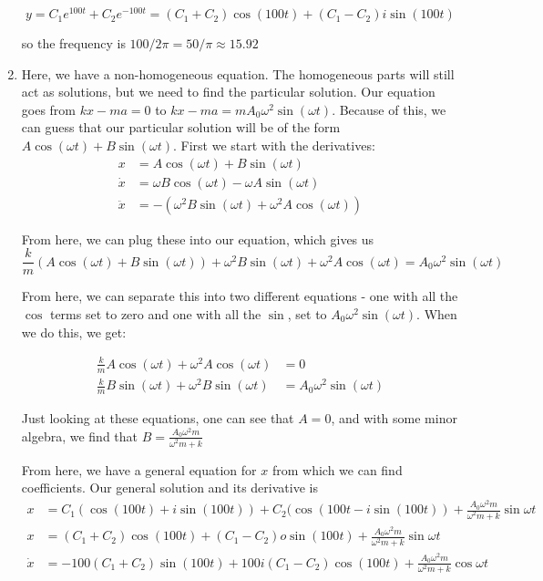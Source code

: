 \documentclass[11pt,answers]{exam}
\begin{document}
\begin{questions}
\begin{solution}
\begin{enumerate}
\[
y = C_1e^{100t} + C_2e^{-100t} = (C_1 + C_2)\cos(100t) + (C_1 - C_2)i\sin{(100t)}
\]

so the frequency is $100/2\pi = 50/\pi \approx 15.92$

\item Here, we have a non-homogeneous equation.  The homogeneous parts will still act as solutions, but we need to find the particular solution.  Our equation goes from $kx - ma = 0$ to $kx - ma = m A_0 \omega^2\sin(\omega t)$.  Because of this, we can guess that our particular solution will be of the form $A\cos(\omega t) + B\sin(\omega t)$.  First we start with the derivatives:
\begin{align*}
x &= A\cos{(\omega t)} + B\sin{(\omega t)}\\
\dot{x} &= \omega B\cos{(\omega t)} - \omega A\sin{(\omega t)}\\
\ddot{x} &= -\left( \omega^2B\sin{(\omega t)} + \omega^2A\cos{(\omega t)} \right)
\end{align*}

From here, we can plug these into our equation, which gives us
\[
\frac{k}{m}\left(A\cos{(\omega t)} + B\sin{(\omega t)}\right) + \omega^2B\sin{(\omega t)} + \omega^2A\cos{(\omega t)} = A_0 \omega^2\sin{(\omega t)}
\]

From here, we can separate this into two different equations - one with all the $\cos$ terms set to zero and one with all the $\sin$, set to $A_0 \omega^2\sin{(\omega t)}$.  When we do this, we get:

\begin{align*}
\frac{k}{m}A\cos{(\omega t)} + \omega^2 A\cos{(\omega t)} &= 0 \\
\frac{k}{m}B\sin{(\omega t)} + \omega^2B\sin{(\omega t)} &= A_0 \omega^2\sin{(\omega t)}
\end{align*}

Just looking at these equations, one can see that $A = 0$, and with some minor algebra, we find that $\displaystyle B = \frac{A_0\omega^2m}{\omega^2m + k}$

From here, we have a general equation for $x$ from which we can find coefficients.  Our general solution and its derivative is
\begin{align*}
x &= C_1(\cos(100t) + i\sin(100t)) + C_2(\cos(100t - i\sin(100t)) + \frac{A_0\omega^2m}{\omega^2m + k}\sin{\omega t}\\
x &= (C_1 + C_2)\cos{(100t)} + (C_1 - C_2)o\sin{(100t)} + \frac{A_0\omega^2m}{\omega^2m + k}\sin{\omega t}\\
\dot{x} &= -100(C_1 + C_2)\sin{(100t)} + 100i(C_1 - C_2)\cos{(100t)} + \frac{A_0\omega^2m}{\omega^2m + k}\cos{\omega t}
\end{align*}


\end{enumerate}
\end{solution}
\end{questions}
\end{document}
